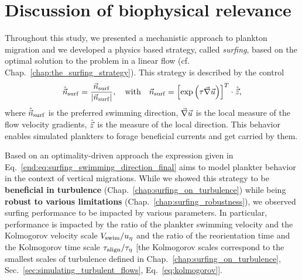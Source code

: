 \chapter{Discussion of biophysical relevance}\label{chap:bio_discussion}

Throughout this study, we presented a mechanistic approach to plankton migration and we developed a physics based strategy, called \textit{surfing}, based on the optimal solution to the problem in a linear flow (cf. Chap.~\ref{chap:the_surfing_strategy}).
This strategy is described by the control
\begin{equation}
	\label{end:eq:surfing_swimming_direction_final}
	\hat{\vec{n}}_{\mathrm{surf}} = \frac{\vec{n}_{\mathrm{surf}}}{\lvert\vec{n}_{\mathrm{surf}}\rvert}, \quad \text{with} \quad \vec{n}_{\mathrm{surf}} = \left[ \exp \left( \tau \vec{\nabla} \vec{u} \right) \right]^T \cdot \hat{\vec{z}},
\end{equation}
where $\hat{\vec{n}}_{\mathrm{surf}}$ is the preferred swimming direction, $\vec{\nabla} \vec{u}$ is the local measure of the flow velocity gradients, $\hat{\vec{z}}$ is the measure of the local direction.
This behavior enables simulated plankters to forage beneficial currents and get carried by them.

Based on an optimality-driven approach the expression given in Eq.~\ref{end:eq:surfing_swimming_direction_final} aims to model plankter behavior in the context of vertical migrations.
While we showed this strategy to be \textbf{beneficial in turbulence} (Chap.~\ref{chap:surfing_on_turbulence}) while being \textbf{robust to various limitations} (Chap.~\ref{chap:surfing_robustness}), we observed surfing performance to be impacted by various parameters. 
In particular, performance is impacted by the ratio of the plankter swimming velocity and the Kolmogorov velocity scale $V_{\mathrm{swim}}/u_{\eta}$ and the ratio of the reorientation time and the Kolmogorov time scale $\tau_{\mathrm{align}}/\tau_{\eta}$ [the Kolmogorov scales correspond to the smallest scales of turbulence defined in Chap.~\ref{chap:surfing_on_turbulence}, Sec.~\ref{sec:simulating_turbulent_flows}, Eq.~\eqref{eq:kolmogorov}].

